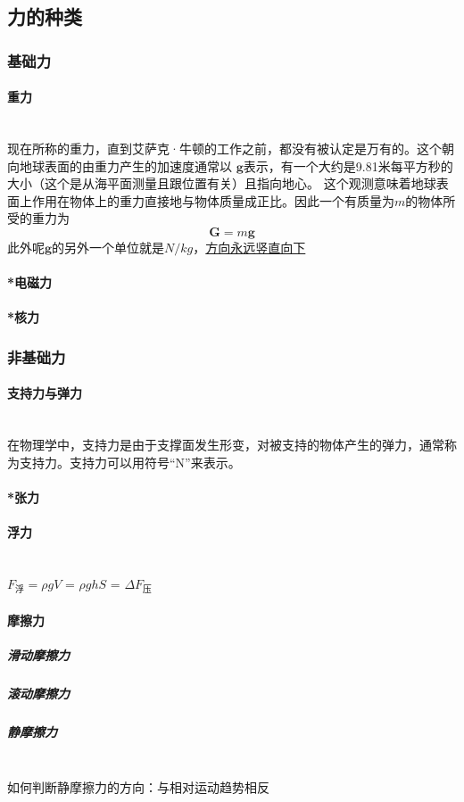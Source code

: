\documentclass[a4paper, 11pt, oneside]{article}
\newcommand{\bol}[1]{\textbf{#1}}
\begin{document}
\subsection{力的种类}
\subsubsection{基础力}
\paragraph{重力}\quad\\
\indent 现在所称的重力，直到艾萨克·牛顿的工作之前，都没有被认定是万有的。这个朝向地球表面的由重力产生的加速度通常以 $\bol{g}$表示，有一个大约是9.81米每平方秒的大小（这个是从海平面测量且跟位置有关）且指向地心。 这个观测意味着地球表面上作用在物体上的重力直接地与物体质量成正比。因此一个有质量为$m$的物体所受的重力为
\begin{displaymath}
	\bol{G} = m\bol{g}
\end{displaymath}
此外呢$\bol{g}$的另外一个单位就是$N/kg$，\underline{方向永远竖直向下}
\paragraph{*电磁力}
\paragraph{*核力}
\subsubsection{非基础力}
\paragraph{支持力与弹力}\quad\\
在物理学中，支持力是由于支撑面发生形变，对被支持的物体产生的弹力，通常称为支持力。支持力可以用符号“N”来表示。
\paragraph{*张力}
\paragraph{浮力}\quad\\
$F_{浮} = \rho g V$ = $\rho g h S$ = $\Delta F_{压}$
\paragraph{摩擦力}
\subparagraph{滑动摩擦力}
\subparagraph{滚动摩擦力}
\subparagraph{静摩擦力}\quad\\
\indent 如何判断静摩擦力的方向：与相对运动趋势相反
\end{document}
